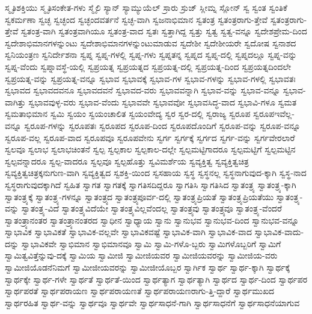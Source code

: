 {ಸ್ಮೃತಿಶಕ್ತಿಯು
ಸ್ಮೃತಿಸಂಕೇತ-ಗಳು
ಸ್ಮೈಲಿ
ಸ್ಯಾನ್
ಸ್ಯಾಮ್ಯುಯೆಲ್
ಸ್ರಾರು
ಸ್ರುಜ್
ಸ್ಲೀಮ್ನ
ಸ್ಲೋನ್
ಸ್ವ
ಸ್ವಂತ
ಸ್ವಂತಿಕೆ
ಸ್ವಕರ್ಮಣಾ
ಸ್ವಚ್ಛ
ಸ್ವಚ್ಛಂದ
ಸ್ವಚ್ಛಂದವರ್ತನೆ
ಸ್ವಚ್ಛ-ವಾಗಿ
ಸ್ವಜನಾಭಿಮಾನ
ಸ್ವತಂತ್ರ
ಸ್ವತಂತ್ರರಾಗು-ತ್ತೇವೆ
ಸ್ವತಂತ್ರರಾಗು-ತ್ತೇವೆ
ಸ್ವತಂತ್ರ-ವಾಗಿ
ಸ್ವತಂತ್ರವಾಗಿಯೂ
ಸ್ವತಂತ್ರ-ವಾದ
ಸ್ವತಃ
ಸ್ವತ್ತಾಗಿದ್ದ
ಸ್ವತ್ತು
ಸ್ವತ್ವ
ಸ್ವತ್ವ-ವನ್ನೂ
ಸ್ವದೇಶಪ್ರೇಮ-ದಿಂದ
ಸ್ವದೇಶಾಭಿಮಾನಗಳನ್ನುಂಟು
ಸ್ವದೇಶಾಭಿಮಾನಗಳನ್ನುಂಟುಮಾಡುವ
ಸ್ವದೇಶೀ
ಸ್ವದೇಶೀಯರೇ
ಸ್ವದೋಷ
ಸ್ವನಾಶದ
ಸ್ವನಿಯಂತ್ರಣ
ಸ್ವನಿರ್ದೇಶನಾ
ಸ್ವಪ್ನ
ಸ್ವಪ್ನ-ಗಳಲ್ಲಿ
ಸ್ವಪ್ನ-ಗಳು
ಸ್ವಪ್ನತನ್ನ
ಸ್ವಪ್ನದ
ಸ್ವಪ್ನ-ದಲ್ಲಿ
ಸ್ವಪ್ನದಲ್ಲೂ
ಸ್ವಪ್ನ-ವನ್ನು
ಸ್ವಪ್ನ-ವೆಂದು
ಸ್ವಪ್ನಾವಸ್ಥೆ-ಯಲ್ಲಿ
ಸ್ವಪ್ರಯತ್ನ
ಸ್ವಪ್ರಯತ್ನದ
ಸ್ವಪ್ರಯತ್ನ-ದಲ್ಲಿ
ಸ್ವಪ್ರಯತ್ನ-ದಿಂದ
ಸ್ವಪ್ರಯತ್ನದಿಂದಲೇ
ಸ್ವಪ್ರಯತ್ನ-ವನ್ನು
ಸ್ವಪ್ರಯತ್ನ-ವನ್ನೂ
ಸ್ವಭಾವ
ಸ್ವಭಾವಕ್ಕೆ
ಸ್ವಭಾವ-ಗಳ
ಸ್ವಭಾವ-ಗಳನ್ನು
ಸ್ವಭಾವ-ಗಳಲ್ಲಿ
ಸ್ವಭಾವತಃ
ಸ್ವಭಾವದ
ಸ್ವಭಾವದವನೂ
ಸ್ವಭಾವದವನೆ
ಸ್ವಭಾವದ-ವರು
ಸ್ವಭಾವವನ್ನಾಗಿ
ಸ್ವಭಾವ-ವನ್ನು
ಸ್ವಭಾವ-ವನ್ನೂ
ಸ್ವಭಾವ-ವಾಗಿತ್ತು
ಸ್ವಭಾವವುಳ್ಳ-ವರು
ಸ್ವಭಾವ-ವೆಂದು
ಸ್ವಭಾವವೇ
ಸ್ವಭಾವವೋ
ಸ್ವಭಾವಸಿದ್ಧ-ವಾದ
ಸ್ವಭಾವಿ-ಗಳೂ
ಸ್ವಮತ
ಸ್ವಮತಾಭಿಮಾನ
ಸ್ವಮಿ
ಸ್ವಯಂ
ಸ್ವಯಂಚಾಲಿತ
ಸ್ವಯಂವೇದ್ಯ
ಸ್ವರ
ಸ್ವರ-ದಲ್ಲಿ
ಸ್ವರಾಜ್ಯ
ಸ್ವರೂಪ
ಸ್ವರೂಪಇವೆಲ್ಲ-ವನ್ನೂ
ಸ್ವರೂಪ-ಗಳನ್ನು
ಸ್ವರೂಪತಃ
ಸ್ವರೂಪದ
ಸ್ವರೂಪ-ದಿಂದ
ಸ್ವರೂಪದೊಂದಿಗೆ
ಸ್ವರೂಪ-ವನ್ನು
ಸ್ವರೂಪ-ವನ್ನೂ
ಸ್ವರೂಪ-ವಲ್ಲ
ಸ್ವರೂಪ-ವಾದ
ಸ್ವರೂಪವೂ
ಸ್ವರೂಪವೇನು
ಸ್ವರ್ಗ
ಸ್ವರ್ಗಕ್ಕೆ
ಸ್ವರ್ಗದ
ಸ್ವರ್ಗ-ವನ್ನು
ಸ್ವರ್ಗವೇರಲಾರೆ
ಸ್ವಲವೂ
ಸ್ವಲಾಭ
ಸ್ವಲಾಭಚಿಂತನೆ
ಸ್ವಲ್ಪ
ಸ್ವಲ್ಪಕಾಲ
ಸ್ವಲ್ಪಕಾಲ-ದಲ್ಲೇ
ಸ್ವಲ್ಪಮಟ್ಟಿಗಾದರೂ
ಸ್ವಲ್ಪಮಟ್ಟಿಗೆ
ಸ್ವಲ್ಪಮಟ್ಟಿನ
ಸ್ವಲ್ಪವನ್ನಾದರೂ
ಸ್ವಲ್ಪ-ವಾದರೂ
ಸ್ವಲ್ಪವೂ
ಸ್ವಲ್ಪಹೊತ್ತು
ಸ್ವವಿಮರ್ಶೆಯ
ಸ್ವವ್ಯಕ್ತಿತ್ವ
ಸ್ವವ್ಯಕ್ತಿತ್ವಚಿತ್ರ
ಸ್ವವ್ಯಕ್ತಿತ್ವಚಿತ್ರಕ್ಕನುಗುಣ-ವಾಗಿ
ಸ್ವವ್ಯಕ್ತಿತ್ವದ
ಸ್ವಶಕ್ತಿ-ಯಿಂದ
ಸ್ವಸಹಾಯ
ಸ್ವಸ್ಥ
ಸ್ವಸ್ಥನಲ್ಲ
ಸ್ವಸ್ಥನಾಗುವುದ-ಕ್ಕಾಗಿ
ಸ್ವಸ್ಥ-ನಾದ
ಸ್ವಸ್ಥರಾಗುವುದಕ್ಕಾಗಿದೆ
ಸ್ವಹಿತ
ಸ್ವಾಗತ
ಸ್ವಾಗತಕ್ಕೆ
ಸ್ವಾಗತಿಸದಿದ್ದರೂ
ಸ್ವಾಗತಿಸಿ
ಸ್ವಾಗತಿಸಿದ
ಸ್ವಾತಂತ್ರ್ಯ
ಸ್ವಾತಂತ್ರ್ಯ-ಕ್ಕಾಗಿ
ಸ್ವಾತಂತ್ರ್ಯಕ್ಕೆ
ಸ್ವಾತಂತ್ರ್ಯ-ಗಳನ್ನೂ
ಸ್ವಾತಂತ್ರ್ಯದ
ಸ್ವಾತಂತ್ರ್ಯಪೂರ್ವ-ದಲ್ಲಿ
ಸ್ವಾತಂತ್ರ್ಯಪ್ರಿಯತೆ
ಸ್ವಾತಂತ್ರ್ಯಪ್ರಿಯತೆಯು
ಸ್ವಾತಂತ್ರ್ಯ-ವನ್ನು
ಸ್ವಾತಂತ್ರ್ಯ-ವಿದೆ
ಸ್ವಾತಂತ್ರ್ಯವಿದೆಯೇ
ಸ್ವಾತಂತ್ರ್ಯವಿಲ್ಲವೆಂದಲ್ಲ
ಸ್ವಾತಂತ್ರ್ಯವು
ಸ್ವಾತಂತ್ರ್ಯವೂ
ಸ್ವಾತಂತ್ರ್ಯ-ವೆಂದರೆ
ಸ್ವಾತಂತ್ರ್ಯಾನಂತರ
ಸ್ವಾತಂತ್ರ್ಯಾನಂತರದ
ಸ್ವಾಧೀನ
ಸ್ವಾಧ್ಯಾಯ
ಸ್ವಾನು
ಸ್ವಾನುಭವ
ಸ್ವಾನುಭವ-ದಿಂದ
ಸ್ವಾನುಭವ-ವನ್ನೂ
ಸ್ವಾಭಾವಿಕ
ಸ್ವಾಭಾವಿಕತೆ
ಸ್ವಾಭಾವಿಕ-ವಲ್ಲವೇ
ಸ್ವಾಭಾವಿಕವಷ್ಟೆ
ಸ್ವಾಭಾವಿಕ-ವಾಗಿ
ಸ್ವಾಭಾವಿಕ-ವಾದ
ಸ್ವಾಭಾವಿಕ-ವಾದು-ದನ್ನು
ಸ್ವಾಭಾವಿಕವೇ
ಸ್ವಾಭಿಮಾನ
ಸ್ವಾಭಿಮಾನವೂ
ಸ್ವಾಮಿ
ಸ್ವಾಮಿ-ಗಳೊ-ಬ್ಬರು
ಸ್ವಾಮಿಗಳೊಬ್ಬರಿಗೆ
ಸ್ವಾಮಿಗೆ
ಸ್ವಾಮಿತ್ವವಿತ್ತೆನ್ನುವು-ದಕ್ಕೆ
ಸ್ವಾಮಿಯ
ಸ್ವಾಮೀಜಿ
ಸ್ವಾಮೀಜಿಯವರ
ಸ್ವಾಮೀಜಿಯವರನ್ನು
ಸ್ವಾಮೀಜಿಯ-ವರು
ಸ್ವಾಮೀಜಿಯೊಡನೆನಿಮಗೆ
ಸ್ವಾಮೀಜೀಯವರನ್ನು
ಸ್ವಾಮೀಜೀಯೊಬ್ಬರ
ಸ್ವಾರ್ಗಿಕ
ಸ್ವಾರ್ಥ
ಸ್ವಾರ್ಥ-ಕ್ಕಾಗಿ
ಸ್ವಾರ್ಥಕ್ಕೆ
ಸ್ವಾರ್ಥಕ್ಕೇ
ಸ್ವಾರ್ಥ-ಗಳೇ
ಸ್ವಾರ್ಥತೆ
ಸ್ವಾರ್ಥತೆ-ಯಿಂದ
ಸ್ವಾರ್ಥತ್ಯಾಗ
ಸ್ವಾರ್ಥತ್ಯಾಗಿ
ಸ್ವಾರ್ಥದ
ಸ್ವಾರ್ಥ-ದಿಂದ
ಸ್ವಾರ್ಥಪರ
ಸ್ವಾರ್ಥಪರತೆ
ಸ್ವಾರ್ಥಪರಾಯಣ
ಸ್ವಾರ್ಥಪರಾಯಣತೆ
ಸ್ವಾರ್ಥಪರಾಯಣರಾಗು-ತ್ತಿ-ದ್ದಾರೆ
ಸ್ವಾರ್ಥಮುಖದ
ಸ್ವಾರ್ಥರಹಿತ
ಸ್ವಾರ್ಥ-ವನ್ನು
ಸ್ವಾರ್ಥವೂ
ಸ್ವಾರ್ಥವೇ
ಸ್ವಾರ್ಥಸಾಧನೆ-ಗಾಗಿ
ಸ್ವಾರ್ಥಸಾಧನೆಗೆ
ಸ್ವಾರ್ಥಸಾಧನೆಯಾಗುವ
}
